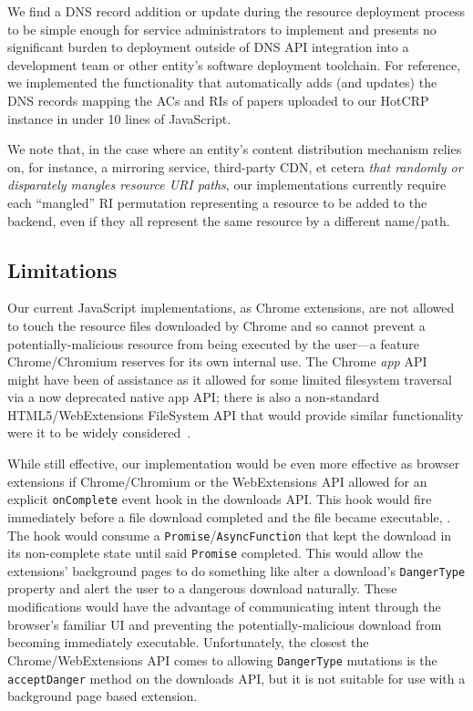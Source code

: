 We find a DNS record addition or update during the resource deployment process
to be simple enough for service administrators to implement and presents no
significant burden to deployment outside of DNS API integration into a
development team or other entity's software deployment toolchain. For reference,
we implemented the functionality that automatically adds (and updates) the DNS
records mapping the ACs and RIs of papers uploaded to our HotCRP instance in
under 10 lines of JavaScript.

We note that, in the case where an entity's content distribution mechanism
relies on, for instance, a mirroring service, third-party CDN, et cetera
\emph{that randomly or disparately mangles resource URI paths}, our
implementations currently require each ``mangled'' RI permutation representing a
resource to be added to the backend, even if they all represent the same
resource by a different name/path.

\subsection{Limitations}


Our current JavaScript implementations, as Chrome extensions, are not allowed to
touch the resource files downloaded by Chrome and so cannot prevent a
potentially-malicious resource from being executed by the user---a feature
Chrome/Chromium reserves for its own internal use. The Chrome \textit{app}
API~\cite{AppAPI} might have been of assistance as it allowed for some limited
filesystem traversal via a now deprecated native app API; there is also a
non-standard HTML5/WebExtensions FileSystem API that would provide similar
functionality were it to be widely considered~\cite{deadSpec}.

While still effective, our implementation would be even more effective as
browser extensions if Chrome/Chromium or the WebExtensions API allowed for an
explicit \texttt{onComplete} event hook in the downloads API. This hook would
fire immediately before a file download completed and the file became
executable, . The hook would consume a \texttt{Promise}/\texttt{AsyncFunction} that
kept the download in its non-complete state until said \texttt{Promise}
completed. This would allow the extensions' background pages to do something
like alter a download's \texttt{DangerType} property and alert the user to a
dangerous download naturally. These modifications would have the advantage of
communicating intent through the browser's familiar UI and preventing the
potentially-malicious download from becoming immediately executable.
Unfortunately, the closest the Chrome/WebExtensions API comes to allowing
\texttt{DangerType} mutations is the \texttt{acceptDanger} method on the
downloads API, but it is not suitable for use with a background page based
extension.

